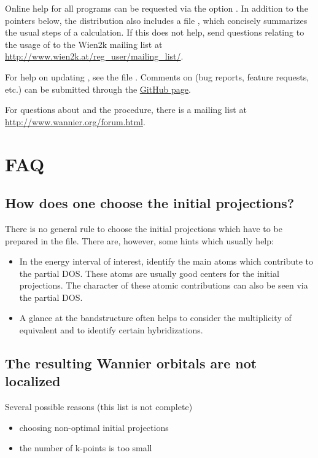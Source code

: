 Online help for all programs can be requested via the option
.  In addition to the pointers below, the \wtow distribution
also includes a file , which concisely summarizes the
usual steps of a calculation.  If this does not help, send questions
relating to the usage of \wtow to the Wien2k mailing list at
\url{http://www.wien2k.at/reg_user/mailing_list/}.

For help on updating \wtow, see the file .  Comments on
\wtow (bug reports, feature requests, etc.) can be submitted through
the \href{https://github.com/wien2wannier/wien2wannier}{GitHub page}.

For questions about \wannier and the \mlwf procedure, there is a
mailing list at \url{http://www.wannier.org/forum.html}.


\section{FAQ}

\subsection{How does one choose the initial projections?}
There is no general rule to choose the initial projections which have
to be prepared in the  file. There are, however, some hints
which usually help:
\begin{itemize}
\item In the energy interval of interest, identify the main atoms
  which contribute to the partial DOS. These atoms are usually good
  centers for the initial projections. The character of these atomic
  contributions can also be seen via the partial DOS.
\item A glance at the bandstructure often helps to consider the
  multiplicity of equivalent \wf and to identify certain
  hybridizations.
\end{itemize}

\subsection{The resulting Wannier orbitals are not localized}
Several possible reasons (this list is not complete)
\begin{itemize}
\item choosing non-optimal initial projections
\item the number of k-points is too small
\end{itemize}

